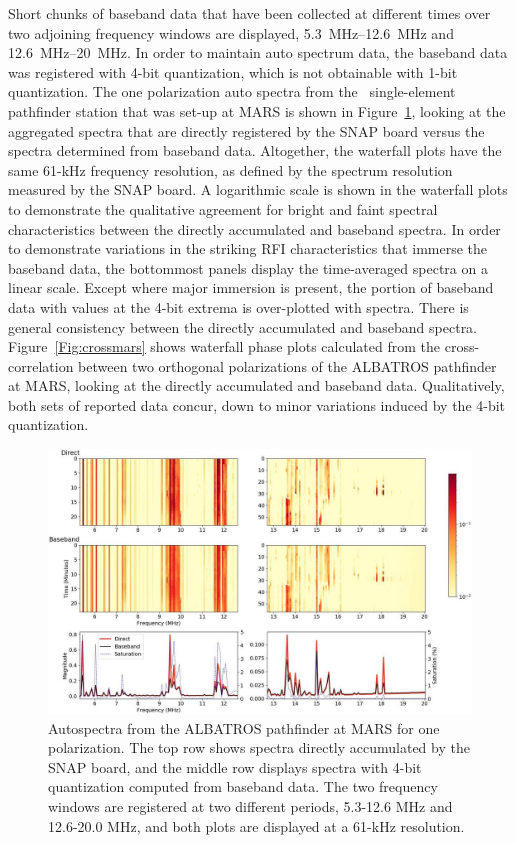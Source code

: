Short chunks of baseband data that have been collected at different times over two adjoining frequency windows are displayed, \SIrange{5.3}{12.6}{\mega \hertz} and \SIrange{12.6}{20}{\mega \hertz}. In order to maintain auto spectrum data, the baseband data was registered with 4-bit quantization, which is not obtainable with 1-bit quantization. The one polarization auto spectra from the \albatros\ single-element pathfinder station that was set-up at MARS is shown in Figure~\ref{Fig:mars}, looking at the aggregated spectra that are directly registered by the SNAP board versus the spectra determined from baseband data. Altogether, the waterfall plots have the same 61-kHz frequency resolution, as defined by the spectrum resolution measured by the SNAP board. A logarithmic scale is shown in the waterfall plots to demonstrate the qualitative agreement for bright and faint spectral characteristics between the directly accumulated and baseband spectra. In order to demonstrate variations in the striking RFI characteristics that immerse the baseband data, the bottommost panels display the time-averaged spectra on a linear scale. Except where major immersion is present, the portion of baseband data with values at the 4-bit extrema is over-plotted with spectra. There is general consistency between the directly accumulated and baseband spectra. Figure~\ref{Fig:crossmars} shows waterfall phase plots calculated from the cross-correlation between two orthogonal polarizations of the ALBATROS pathfinder at MARS, looking at the directly accumulated and baseband data. Qualitatively, both sets of reported data concur, down to minor variations induced by the 4-bit quantization.

\begin{figure}
	\centering
	\includegraphics[width=\linewidth]{Figures/mars.jpg}
	\caption{Autospectra from the ALBATROS pathfinder at MARS for one polarization. The top row shows spectra directly accumulated by the SNAP board, and the middle row displays spectra with 4-bit quantization computed from baseband data. The two frequency windows are registered at two different periods, 5.3-12.6 MHz and 12.6-20.0 MHz, and both plots are displayed at a 61-kHz resolution.}
	\label{Fig:mars}
\end{figure}

